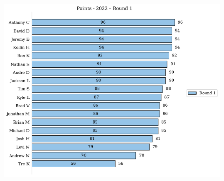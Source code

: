 \documentclass[10pt]{article}
\begin{document}
\begin{minipage}[t]{13cm}
    \begin{figure}[H]
        \vspace{-3.5cm}
        \includegraphics[width=12cm]{../../figures/2022/Points-2022-Round1.pdf}
    \end{figure}
\end{minipage}
\end{document}
